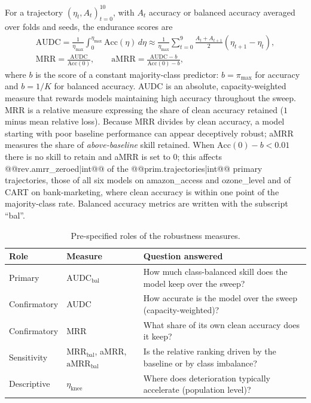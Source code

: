 \documentclass[pdflatex,sn-mathphys]{sn-jnl}
\theoremstyle{thmstyleone}
\theoremstyle{thmstyletwo}
\theoremstyle{thmstylethree}
\newcommand{\Acc}{\mathrm{Acc}}
\newcommand{\AUDC}{\mathrm{AUDC}}
\newcommand{\MRR}{\mathrm{MRR}}
\newcommand{\aMRR}{\mathrm{aMRR}}
\newcommand{\etamax}{\eta_{\max}}
\newcommand{\etaknee}{\eta_{\mathrm{knee}}}
\begin{document}
For a trajectory $(\eta_t,A_t)_{t=0}^{10}$, with $A_t$ accuracy or balanced accuracy averaged over folds and seeds, the endurance scores are
\begin{gather}
\AUDC=\frac{1}{\etamax}\int_0^{\etamax}\Acc(\eta)\,d\eta\approx\frac{1}{\etamax}\sum_{t=0}^{9}\frac{A_t+A_{t+1}}{2}(\eta_{t+1}-\eta_t),\label{eq:audc}\\
\MRR=\frac{\AUDC}{\Acc(0)},\qquad \aMRR=\frac{\AUDC-b}{\Acc(0)-b},\label{eq:mrr}
\end{gather}
where $b$ is the score of a constant majority-class predictor: $b=\pi_{\max}$ for accuracy and $b=1/K$ for balanced accuracy. AUDC is an absolute, capacity-weighted measure that rewards models maintaining high accuracy throughout the sweep. MRR is a relative measure expressing the share of clean accuracy retained ($1$ minus mean relative loss). Because MRR divides by clean accuracy, a model starting with poor baseline performance can appear deceptively robust; aMRR measures the share of \emph{above-baseline} skill retained. When $\Acc(0)-b<0.01$ there is no skill to retain and aMRR is set to 0; this affects @@{rev.amrr_zeroed|int}@@ of the @@{prim.trajectories|int}@@ primary trajectories, those of all six models on amazon\_access and ozone\_level and of CART on bank-marketing, where clean accuracy is within one point of the majority-class rate. Balanced accuracy metrics are written with the subscript ``bal''.

\begin{table}[t]
\centering
\footnotesize
\caption{Pre-specified roles of the robustness measures.}\label{tab:roles}
\begin{tabular}{@{}llp{6.5cm}@{}}
\toprule
Role & Measure & Question answered \\
\midrule
Primary & $\AUDC_{\mathrm{bal}}$ & How much class-balanced skill does the model keep over the sweep? \\
Confirmatory & AUDC & How accurate is the model over the sweep (capacity-weighted)? \\
Confirmatory & MRR & What share of its own clean accuracy does it keep? \\
Sensitivity & $\MRR_{\mathrm{bal}}$, aMRR, $\aMRR_{\mathrm{bal}}$ & Is the relative ranking driven by the baseline or by class imbalance? \\
Descriptive & $\etaknee$ & Where does deterioration typically accelerate (population level)? \\
\bottomrule
\end{tabular}
\end{table}
\end{document}
